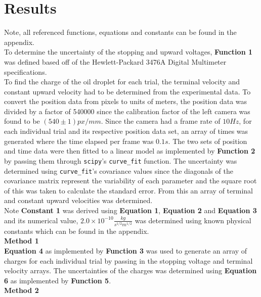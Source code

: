 \documentclass[
	letterpaper, %
	10pt, %
]{CSUniSchoolLabReport}
\begin{document}
\section{Results}
Note, all referenced functions, equations and constants can be found in the appendix.\\

To determine the uncertainty of the stopping and upward voltages, \textbf{Function 1}
was defined based off of the Hewlett-Packard 3476A Digital Multimeter specifications.\\

To find the charge of the oil droplet for each trial, the terminal velocity and constant
upward velocity had to be determined from the experimental data. To convert the
position data from pixels to units of meters, the position data was divided by
a factor of 540000 since the calibration factor of the left camera was found to
be $(540 \pm 1) px/mm$. Since the camera had a frame rate of $10 Hz$, for each individual
trial and its respective position data set, an array of times was generated where the
time elapsed per frame was $0.1 s$. The two sets of position and time data were then
fitted to a linear model as implemented by \textbf{Function 2} by passing them through \lstinline{scipy}'s
\lstinline{curve_fit} function. The uncertainty was determined using \lstinline{curve_fit}'s
covariance values since the diagonals of the covariance matrix represent the variability
of each parameter and the square root of this was taken to calculate the standard error.
From this an array of terminal and constant upward velocities was determined.\\

Note \textbf{Constant 1} was derived using \textbf{Equation 1}, \textbf{Equation 2} and \textbf{Equation 3} and its
numerical value, $2.0\times10^{-10}\frac{kg}{s^{1/2}m^{1/2}}$ was determined using known physical constants which can be found in the appendix.\\

{\large\textbf{Method 1}}\\

\textbf{Equation 4} as implemented by \textbf{Function 3} was used to generate an array of charges for
each individual trial by passing in the stopping voltage and terminal velocity arrays. The uncertainties
of the charges was determined using \textbf{Equation 6} as implemented by \textbf{Function 5}.\\

{\large\textbf{Method 2}}\\
\end{document}
